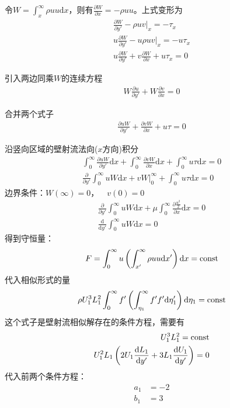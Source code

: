 令$W=\int_{x}^{\infty}\rho uu\mathrm{d}x$，则有$\frac{\partial W}{\partial x}=-\rho uu$。上式变形为
\begin{align}
    \frac{\partial W}{\partial y'}-\rho uv|_{x}=-\tau_{x}\\
    u\frac{\partial W}{\partial y'}-u\rho uv|_{x}=-u\tau_{x}\\%
    u\frac{\partial W}{\partial y'}+v\frac{\partial W}{\partial x}+u\tau_{x}=0
\end{align}

引入两边同乘$W$的连续方程
\begin{align}
    W\frac{\partial u}{\partial y'}+W\frac{\partial v}{\partial x}=0
\end{align}

合并两个式子
\begin{align}
    \frac{\partial uW}{\partial y'}+\frac{\partial vW}{\partial x}+u\tau=0
\end{align}

沿竖向区域的壁射流法向($x$方向)积分
\begin{align}
    \int_{0}^{\infty}\frac{\partial uW}{\partial y'}\mathrm{d}x+\int_{0}^{\infty}\frac{\partial vW}{\partial x}\mathrm{d}x+\int_{0}^{\infty}u\tau\mathrm{d}x=0\\
    \frac{\partial }{\partial y'}\int_{0}^{\infty}uW\mathrm{d}x+vW|_{0}^{\infty}+\int_{0}^{\infty}u\tau\mathrm{d}x=0
\end{align}
边界条件：$W(\infty)=0，\quad v(0)=0$
\begin{align}
    \frac{\partial }{\partial y'}\int_{0}^{\infty}uW\mathrm{d}x+\mu\int_{0}^{\infty}\frac{\partial \frac{u^{2}}{2}}{\partial x}\mathrm{d}x=0\\
    \frac{\mathrm{d} }{\mathrm{d} y'}\int_{0}^{\infty}uW\mathrm{d}x=0
\end{align}
得到守恒量：
\begin{align}
    F=\int_{0}^{\infty}u\left(\int_{x'}^{\infty}\rho uu\mathrm{d}x'\right)\mathrm{d}x=\mathrm{const}
\end{align}
代入相似形式的量
\begin{align}
    \rho U_{1}^{3}L_{1}^{2}\int_{0}^{\infty}f'\left(\int_{\eta_{1}}^{\infty}f'f'\mathrm{d}\eta_{1}'\right)\mathrm{d}\eta_{1}=\mathrm{const}
\end{align}
这个式子是壁射流相似解存在的条件方程，需要有
\begin{align}
    U_{1}^{3}L_{1}^{2}=\mathrm{const}\\
    U_{1}^{2}L_{1}\left(2U_{1}\frac{\mathrm{d}L_{1}}{\mathrm{d}y'}+3L_{1}\frac{\mathrm{d}U_{1}}{\mathrm{d}y'}\right)=0
\end{align}
代入前两个条件方程：
\begin{align}
    a_{1}&=-2\\
    b_{1}&=3
\end{align}

